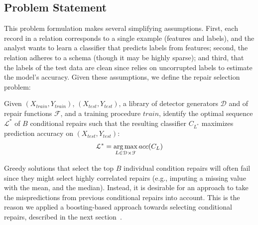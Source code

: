 \subsection{Problem Statement}
This problem formulation makes several simplifying assumptions.  
First, each record in a relation corresponds to a single example (features and labels), and the analyst wants to learn a classifier that predicts labels from features; second, the relation adheres to a schema (though it may be highly sparse); and third, that the labels of the test data are clean since \sys relies on uncorrupted labels to estimate the model's accuracy.
Given these assumptions, we define the repair selection problem:

\begin{problem}\sloppy
Given $(X_{train}, Y_{train})$, $(X_{test}, Y_{test})$, a library of detector generators $\mathcal{D}$ and of repair functions $\mathcal{F}$, and a training procedure $train$, identify the optimal sequence $\mathcal{L}^*$ of $B$ conditional repairs such that the resulting classifier $C_{L^*}$  maximizes prediction accuracy on $(X_{test}, Y_{test})$:
$$\mathcal{L}^* = \operatorname*{arg\,max}_{L \in \mathcal{D}\times\mathcal{F}} acc(C_L)$$
\end{problem}

Greedy solutions that select the top $B$ individual condition repairs will often fail since they might select highly correlated repairs (e.g., imputing a missing value with the mean, and the median).
Instead, it is desirable for an approach to take the mispredictions from previous conditional repairs into account.  This is the reason we applied a boosting-based approach towards selecting conditional repairs, described in the next section~\cite{schapire2003boosting}.


